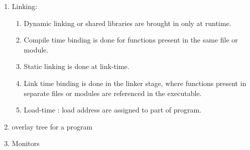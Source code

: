 \begin{enumerate}
  \item Linking:
    \begin{enumerate}
      \item Dynamic linking or shared libraries are brought in only at runtime.
      \item Compile time binding is done for functions present in the same file or module.
      \item Static linking is done at link-time.
      \item Link time binding is done in the linker stage, where functions present in separate files or modules are referenced in the executable.
      \item Load-time : load address are assigned to part of program.
  \end{enumerate}

  \item  overlay tree for a program

  \item Monitors

\end{enumerate}








